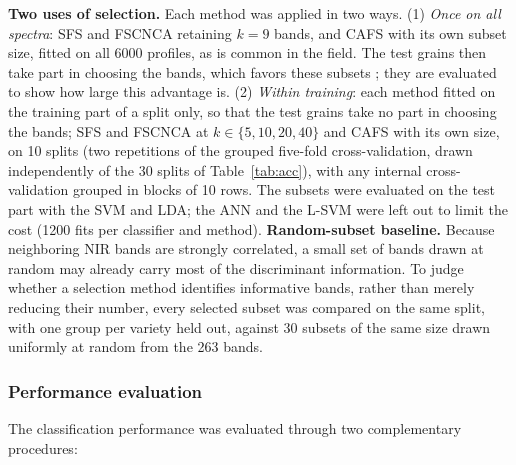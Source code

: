 \documentclass[final,5p,times,twocolumn]{elsarticle}
\newcommand{\added}[1]{#1}
\begin{document}
\added{\textbf{Two uses of selection.} Each method was applied in two ways. (1) \emph{Once on all spectra}: SFS and FSCNCA retaining $k=9$ bands, and CAFS with its own subset size, fitted on all 6000 profiles, as is common in the field. The test grains then take part in choosing the bands, which favors these subsets \citep{Varma2006}; they are evaluated to show how large this advantage is. (2) \emph{Within training}: each method fitted on the training part of a split only, so that the test grains take no part in choosing the bands; SFS and FSCNCA at $k\in\{5,10,20,40\}$ and CAFS with its own size, on 10 splits (two repetitions of the grouped five-fold cross-validation, drawn independently of the 30 splits of Table~\ref{tab:acc}), with any internal cross-validation grouped in blocks of 10 rows. The subsets were evaluated on the test part with the SVM and LDA; the ANN and the L-SVM were left out to limit the cost (1200 fits per classifier and method).}
\added{\textbf{Random-subset baseline.} Because neighboring NIR bands are strongly correlated, a small set of bands drawn at random may already carry most of the discriminant information. To judge whether a selection method identifies informative bands, rather than merely reducing their number, every selected subset was compared on the same split, with one group per variety held out, against 30 subsets of the same size drawn uniformly at random from the 263 bands.}

\subsubsection{Performance evaluation}\label{sec_performance}

The classification performance was evaluated through two complementary procedures: 
\end{document}
